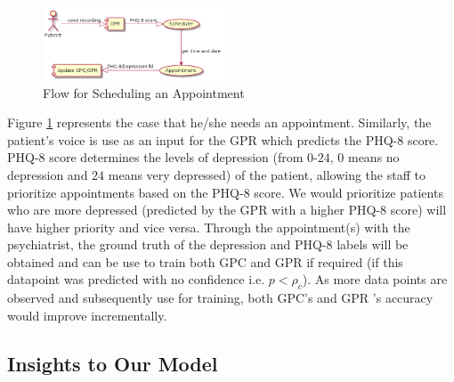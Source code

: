 \documentclass{article}
\begin{document}
	\begin{figure}[h]
 		\begin{center}
		\includegraphics[width=0.48\textwidth]{appointment} 
  		\end{center}
  		\caption{Flow for Scheduling an Appointment}
  		\label{sch_app} 
 	\end{figure}

	Figure \ref{sch_app} represents the case that he/she needs an appointment. 
	Similarly, the patient's voice is use as an input for the GPR which predicts the PHQ-8 score. 
	PHQ-8 score determines the levels of depression (from $0$-$24$, $0$ means no depression and $24$ means very depressed) of the patient, allowing the staff to prioritize appointments based on the PHQ-8 score.
	We would prioritize patients who are more depressed (predicted by the GPR with a higher PHQ-8 score) will have higher priority and vice versa.
	Through the appointment(s) with the psychiatrist, the ground truth of the depression and PHQ-8 labels will be obtained and can be use to train both GPC and GPR if required (if this datapoint was predicted with no confidence i.e. $p < \rho_c$).
	As more data points are observed and subsequently use for training, both GPC's and GPR 's accuracy would improve incrementally.

	\subsection{Insights to Our Model}
\end{document}
